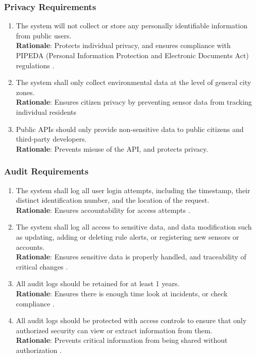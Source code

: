 \documentclass[]{article}
\begin{document}
\subsubsection{Privacy Requirements}
\label{ssub:privacy_requirements}
\begin{enumerate}[{SR-P}1. ]
	\item The system will not collect or store any personally identifiable information from public users. \\
    \textbf{Rationale}: Protects individual privacy, and ensures compliance with PIPEDA (Personal Information Protection and Electronic Documents Act) regulations \cite{pipeda}.

    \item The system shall only collect environmental data at the level of general city zones. \\
    \textbf{Rationale}: Ensures citizen privacy by preventing sensor data from tracking individual residents

    \item Public APIs should only provide non-sensitive data to public citizens and third-party developers. \\
    \textbf{Rationale}: Prevents misuse of the API, and protects privacy.
    
\end{enumerate}

\subsubsection{Audit Requirements}
\label{ssub:audit_requirements}
\begin{enumerate}[{SR-AU}1. ]
	\item The system shall log all user login attempts, including the timestamp, their distinct identification number, and the location of the request. \\
    \textbf{Rationale}: Ensures accountability for access attempts \cite{english2020}.

    \item The system shall log all access to sensitive data, and data modification such as updating, adding or deleting rule alerts, or registering new sensors or accounts. \\
    \textbf{Rationale}: Ensures sensitive data is properly handled, and traceability of critical changes \cite{secoda2025}.

    \item All audit logs should be retained for at least 1 years. \\
    \textbf{Rationale}: Ensures there is enough time look at incidents, or check compliance \cite{Dreshner2025}.

    \item All audit logs should be protected with access controls to ensure that only authorized security can view or extract information from them. \\
    \textbf{Rationale}: Prevents critical information from being shared without authorization \cite{Dreshner2025}.
    
\end{enumerate}
\end{document}
